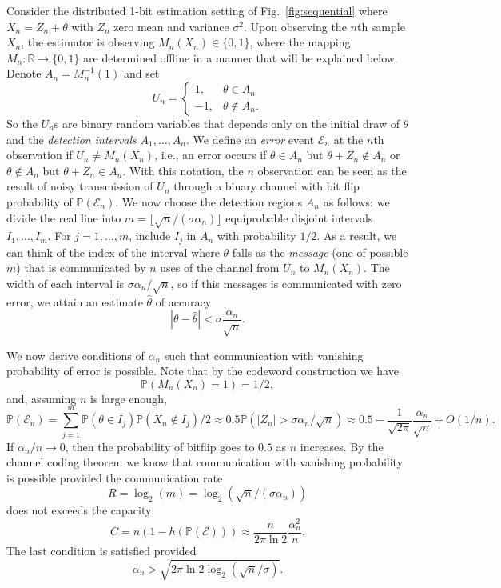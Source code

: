 \documentclass[letterpaper, conference]{IEEEtran}      %
\begin{document}
Consider the distributed 1-bit estimation setting of Fig.~\ref{fig:sequential} where $X_n = Z_n + \theta$ with $Z_n$ zero mean and variance $\sigma^2$. Upon observing the $n$th sample $X_n$, the estimator is observing $M_n(X_n) \in \{0,1\}$, where the mapping $M_n : \mathbb R \rightarrow \{0,1\}$ are determined offline in a manner that will be explained below. Denote $A_n = M_n^{-1}(1)$ and set 
\[
U_n = \begin{cases} 1, & \theta \in A_n \\
-1, & \theta \notin A_n. 
\end{cases}
\]
So the $U_n$s are binary random variables that depends only on the initial draw of $\theta$ and the \emph{detection intervals} $A_1,\ldots,A_n$. We define an \emph{error} event $\mathcal E_n$ at the $n$th observation if $U_n \neq M_n(X_n)$, i.e., an error occurs if $\theta \in A_n$ but $\theta + Z_n \notin A_n$ or $\theta \notin A_n$ but $\theta +Z_n \in A_n$. With this notation, the $n$ observation can be seen as the result of noisy transmission of  $U_n$ through a binary channel with bit flip probability of $\mathbb P( \mathcal E_n)$. We now choose the detection regions $A_n$ as follows: we divide the real line into $m = \lfloor   \sqrt{n} /  (\sigma \alpha_n) \rfloor$ equiprobable disjoint intervals $I_1,\ldots,I_m$. For $j=1,\ldots,m$, include $I_j$ in $A_n$ with probability $1/2$. As a result, we can think of the index of the interval where $\theta$ falls as the \emph{message} (one of possible $m$) that is communicated by $n$ uses of the channel from $U_n$ to $M_n(X_n)$. The width of each interval is $\sigma \alpha_n/ \sqrt{n}$, so if this messages is communicated with zero error, we attain an estimate $\widehat{\theta}$ of accuracy 
\[
\left| \theta - \widehat{\theta} \right|  <  \sigma \frac{\alpha_n}{\sqrt{n}}. 
\]

We now derive conditions of $\alpha_n$ such that communication with vanishing probability of error is possible. Note that by the codeword construction we have
\[
\mathbb P(M_n(X_n)=1) = 1/2,
\]
and, assuming $n$ is large enough,
\[
\mathbb P(\mathcal E_n) = \sum_{j=1}^m \mathbb P(\theta \in I_j)  \mathbb P(X_n \notin I_j) /2 \approx 0.5 \mathbb P( |Z_n|> \sigma \alpha_n/\sqrt{n}) \approx 0.5 -  \frac{1}{\sqrt{2\pi}} \frac{\alpha_n}{\sqrt{n}}+O(1/n).
\]
If $\alpha_n / n \rightarrow 0$, then the probability of bitflip goes to $0.5$ as $n$ increases. By the channel coding theorem we know that communication with vanishing probability is possible provided the communication rate
\[
R = \log_2(m) = \log_2(\sqrt{n} / (\sigma \alpha_n)) 
\]
does not exceeds the capacity:
\[
 C = n(1-h( \mathbb P(\mathcal E))) \approx \frac{n}{2\pi \ln 2} \frac{\alpha_n^2}{n} .
\]
The last condition is satisfied provided 
\[
\alpha_n > \sqrt{2 \pi \ln 2 \log_2(\sqrt{n}/\sigma)}.
\]
\end{document}
